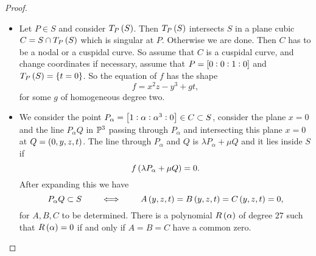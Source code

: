 \begin{proof}
\hfill
\begin{itemize}
\item Let $ P \in S $ and consider $ T_P\br{S} $. Then $ T_P\br{S} $ intersects $ S $ in a plane cubic $ C = S \cap T_P\br{S} $ which is singular at $ P $. Otherwise we are done. Then $ C $ has to be a nodal or a cuspidal curve. So assume that $ C $ is a cuspidal curve, and change coordinates if necessary, assume that $ P = \sbr{0 : 0 : 1 : 0} $ and $ T_P\br{S} = \cbr{t = 0} $. So the equation of $ f $ has the shape
$$ f = x^2z - y^3 + gt, $$
for some $ g $ of homogeneous degree two.
\item We consider the point $ P_\alpha = \sbr{1 : \alpha : \alpha^3 : 0} \in C \subset S $, consider the plane $ x = 0 $ and the line $ P_\alpha Q $ in $ \P^3 $ passing through $ P_\alpha $ and intersecting this plane $ x = 0 $ at $ Q = \br{0, y, z, t} $. The line through $ P_\alpha $ and $ Q $ is $ \lambda P_\alpha + \mu Q $ and it lies inside $ S $ if
$$ f\br{\lambda P_\alpha + \mu Q} = 0. $$
After expanding this we have
$$ P_\alpha Q \subset S \qquad \iff \qquad A\br{y, z, t} = B\br{y, z, t} = C\br{y, z, t} = 0, $$
for $ A, B, C $ to be determined. There is a polynomial $ R\br{\alpha} $ of degree $ 27 $ such that $ R\br{\alpha} = 0 $ if and only if $ A = B = C $ have a common zero.

\pagebreak



\end{itemize}
\end{proof}
